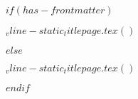 $if(has-frontmatter)$
  \begin{frontmatter}
    \begin{titlepage}
      $_vline-static_titlepage.tex()$
    \end{titlepage}
  \end{frontmatter}
$else$
  \begin{titlepage}
    $_vline-static_titlepage.tex()$
  \end{titlepage}
$endif$
